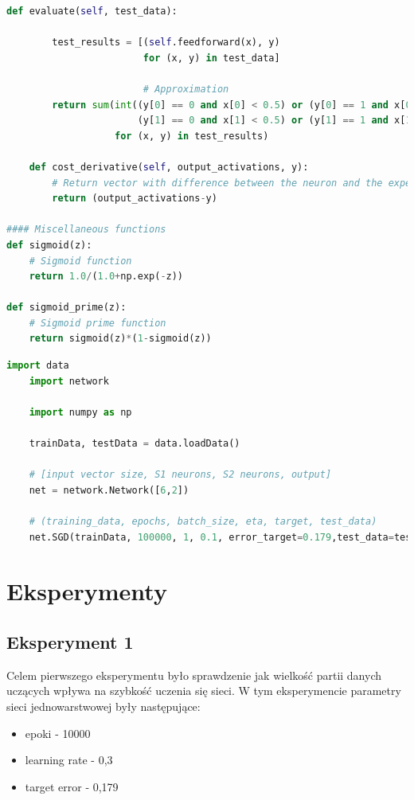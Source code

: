 \documentclass[12pt,twoside]{article}
\begin{document}
\begin{lstlisting}[caption={Plik zawierający sieć - network.py},label={Lst:network_py},language=Python,basicstyle=\scriptsize]
    def evaluate(self, test_data):

        test_results = [(self.feedforward(x), y)
                        for (x, y) in test_data]

                        # Approximation
        return sum(int((y[0] == 0 and x[0] < 0.5) or (y[0] == 1 and x[0] > 0.5) and 
                       (y[1] == 0 and x[1] < 0.5) or (y[1] == 1 and x[1] > 0.5)) 
                   for (x, y) in test_results)

    def cost_derivative(self, output_activations, y):
        # Return vector with difference between the neuron and the expected result
        return (output_activations-y)

#### Miscellaneous functions
def sigmoid(z):
    # Sigmoid function
    return 1.0/(1.0+np.exp(-z))

def sigmoid_prime(z):
    # Sigmoid prime function
    return sigmoid(z)*(1-sigmoid(z))


\end{lstlisting}

\begin{lstlisting}[caption={Plik wywołujący przykładową sieć - main.py},label={Lst:main_py},language=Python,basicstyle=\scriptsize]
	import data
	import network
	
	import numpy as np
	
	trainData, testData = data.loadData()
	
	# [input vector size, S1 neurons, S2 neurons, output]
	net = network.Network([6,2])
	
	# (training_data, epochs, batch_size, eta, target, test_data)
	net.SGD(trainData, 100000, 1, 0.1, error_target=0.179,test_data=testData)
\end{lstlisting}

\clearpage	

\section{Eksperymenty}
\subsection{Eksperyment 1}
Celem pierwszego eksperymentu było sprawdzenie jak wielkość partii danych uczących wpływa na szybkość uczenia się sieci.
W tym eksperymencie parametry sieci jednowarstwowej były następujące:
\begin{itemize}
	\item epoki - 10000
	\item learning rate - 0,3
	\item target error - 0,179
\end{itemize}
\end{document}

